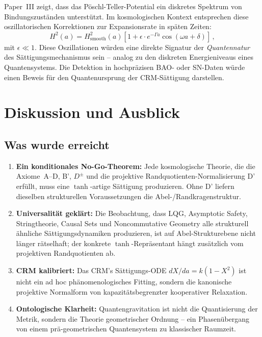 \documentclass[aps,prd,twocolumn,superscriptaddress,nofootinbib]{revtex4-2}
\begin{document}
Paper~III \cite{Geiger2026c} zeigt, dass das Pöschl-Teller-Potential ein diskretes Spektrum von Bindungszuständen unterstützt. Im kosmologischen Kontext entsprechen diese oszillatorischen Korrektionen zur Expansionsrate in späten Zeiten:
\begin{equation}
H^2(a) = H_{\mathrm{smooth}}^2(a)\left[1 + \epsilon \cdot e^{-\Gamma a} \cos(\omega a + \delta)\right]\,,
\end{equation}
mit $\epsilon \ll 1$. Diese Oszillationen würden eine direkte Signatur der \textit{Quantennatur} des Sättigungsmechanismus sein -- analog zu den diskreten Energieniveaus eines Quantensystems. Die Detektion in hochpräzisen BAO- oder SN-Daten würde einen Beweis für den Quantenursprung der CRM-Sättigung darstellen.


\section{Diskussion und Ausblick}
\label{sec:discussion}

\subsection{Was wurde erreicht}

\begin{enumerate}
\item \textbf{Ein konditionales No-Go-Theorem:} Jede kosmologische Theorie, die die Axiome~A--D, B', $D^\pm$ und die projektive Randquotienten-Normalisierung D' erfüllt, muss eine $\tanh$-artige Sättigung produzieren. Ohne D' liefern dieselben strukturellen Voraussetzungen die Abel-/Randkragenstruktur.

\item \textbf{Universalität geklärt:} Die Beobachtung, dass LQG, Asymptotic Safety, Stringtheorie, Causal Sets und Noncommutative Geometry alle strukturell ähnliche Sättigungsdynamiken produzieren, ist auf Abel-Strukturebene nicht länger rätselhaft; der konkrete $\tanh$-Repräsentant hängt zusätzlich vom projektiven Randquotienten ab.

\item \textbf{CRM kalibriert:} Das CRM's Sättigungs-ODE $dX/da = k(1-X^2)$ ist nicht ein ad hoc phänomenologisches Fitting, sondern die kanonische projektive Normalform von kapazitätsbegrenzter kooperativer Relaxation.

\item \textbf{Ontologische Klarheit:} Quantengravitation ist nicht die Quantisierung der Metrik, sondern die Theorie geometrischer Ordnung -- ein Phasenübergang von einem prä-geometrischen Quantensystem zu klassischer Raumzeit.
\end{enumerate}
\end{document}

